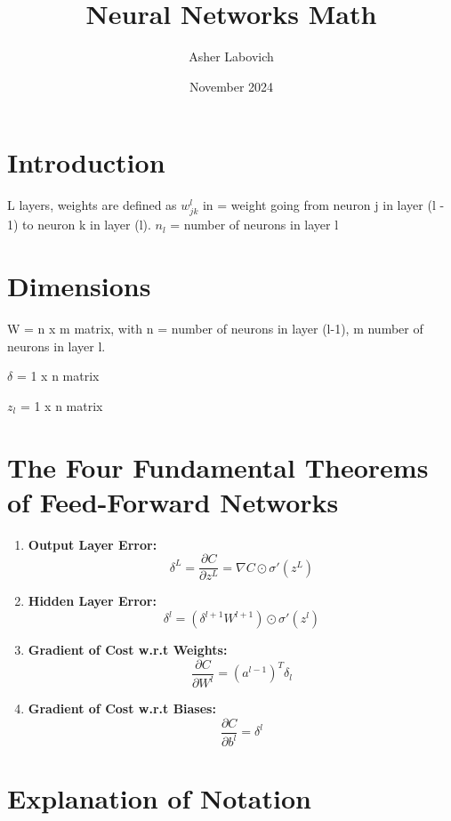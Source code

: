 \documentclass{article}
\title{Neural Networks Math}
\author{Asher Labovich}
\date{November 2024}
\begin{document}
\maketitle

\section{Introduction}
L layers, weights are defined as $w_{jk}^l$ in = weight going from neuron j in layer (l - 1) to neuron k in layer (l). $n_l$ = number of neurons in layer l

\section*{Dimensions}
W = n x m matrix, with n = number of neurons in layer (l-1), m number of neurons in layer l.

$\delta$ = 1 x n matrix 

$z_l$ = 1 x n matrix

\section*{The Four Fundamental Theorems of Feed-Forward Networks}

\begin{enumerate}
    \item \textbf{Output Layer Error:}
    \[
    \delta^L = \frac{\partial C}{\partial z^L} = \nabla C \odot \sigma'(z^L)
    \]

    \item \textbf{Hidden Layer Error:}
    \[
    \delta^l = (\delta^{l+1} W^{l+1}) \odot \sigma'(z^l)
    \]

    \item \textbf{Gradient of Cost w.r.t Weights:}
    \[
    \frac{\partial C}{\partial W^l} = (a^{l-1})^T \delta_l
    \]

    \item \textbf{Gradient of Cost w.r.t Biases:}
    \[
    \frac{\partial C}{\partial b^l} = \delta^l
    \]
\end{enumerate}

\section*{Explanation of Notation}
\end{document}
